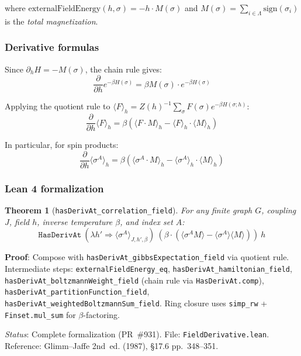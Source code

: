 \documentclass[a4paper,11pt]{article}
\newtheorem{theorem}{Theorem}
\begin{document}
where $\text{externalFieldEnergy}(h, \sigma) = -h \cdot M(\sigma)$ and $M(\sigma) = \sum_{i \in \Lambda} \text{sign}(\sigma_i)$ is the \emph{total magnetization}.

\subsubsection*{Derivative formulas}

Since $\partial_h H = -M(\sigma)$, the chain rule gives:
\[
  \frac{\partial}{\partial h} e^{-\beta H(\sigma)} = \beta M(\sigma) \cdot e^{-\beta H(\sigma)}
\]

Applying the quotient rule to $\langle F \rangle_h = Z(h)^{-1} \sum_\sigma F(\sigma) e^{-\beta H(\sigma; h)}$:
\[
  \frac{\partial}{\partial h} \langle F \rangle_h
  = \beta \left( \langle F \cdot M \rangle_h - \langle F \rangle_h \cdot \langle M \rangle_h \right)
\]

In particular, for spin products:
\[
  \frac{\partial}{\partial h} \langle \sigma^A \rangle_h
  = \beta \left( \langle \sigma^A \cdot M \rangle_h - \langle \sigma^A \rangle_h \cdot \langle M \rangle_h \right)
\]

\subsubsection*{Lean 4 formalization}

\begin{theorem}[\texttt{hasDerivAt\_correlation\_field}]
For any finite graph $G$, coupling $J$, field $h$, inverse temperature $\beta$, and index set $A$:
\[
  \mathtt{HasDerivAt}\ (\lambda h' \Rightarrow \langle \sigma^A \rangle_{J,h',\beta})
  \ (\beta \cdot (\langle \sigma^A M \rangle - \langle \sigma^A \rangle \langle M \rangle))\ h
\]
\end{theorem}

\noindent\textbf{Proof}: Compose with \texttt{hasDerivAt\_gibbsExpectation\_field} via quotient rule.
Intermediate steps: \texttt{externalFieldEnergy\_eq}, \texttt{hasDerivAt\_hamiltonian\_field},
\texttt{hasDerivAt\_boltzmannWeight\_field} (chain rule via \texttt{HasDerivAt.comp}),
\texttt{hasDerivAt\_partitionFunction\_field}, \texttt{hasDerivAt\_weightedBoltzmannSum\_field}.
Ring closure uses \texttt{simp\_rw} + \texttt{Finset.mul\_sum} for $\beta$-factoring.

\noindent\textit{Status}: Complete formalization (PR~\#931).
File: \texttt{FieldDerivative.lean}.
Reference: Glimm--Jaffe 2nd~ed. (1987), \S17.6 pp.~348--351.
\end{document}
